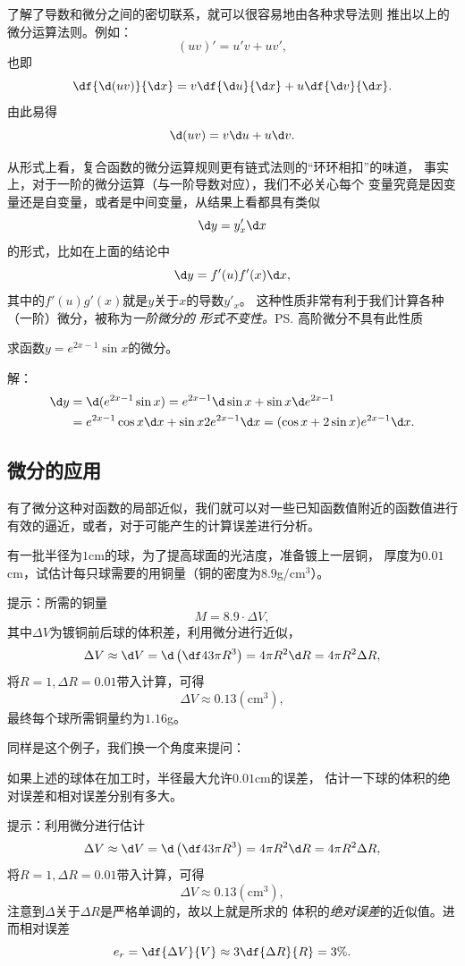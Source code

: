了解了导数和微分之间的密切联系，就可以很容易地由各种求导法则
推出以上的微分运算法则。例如：
$$(uv)'=u'v+uv',$$
也即
$$\df{\d(uv)}{\d x}=v\df{\d u}{\d x}+u\df{\d v}{\d x}.$$
由此易得
$$\d(uv)=v\d u+u\d v.$$

从形式上看，复合函数的微分运算规则更有链式法则的“环环相扣”的味道，
事实上，对于一阶的微分运算（与一阶导数对应），我们不必关心每个
变量究竟是因变量还是自变量，或者是中间变量，从结果上看都具有类似
$$\d y=y'_x\d x$$
的形式，比如在上面的结论中
$$\d y=f'(u)f'(x)\d x,$$
其中的$f'(u)g'(x)$就是$y$关于$x$的导数$y'_x$。
这种性质非常有利于我们计算各种（一阶）微分，被称为{\it 一阶微分的
形式不变性。}\ps{高阶微分不具有此性质}

\bs
\egz 求函数$y=e^{2x-1}\sin x$的微分。

解：
\begin{align*}
	\d y
	&=\d(e^{2x-1}\sin x)
	=e^{2x-1}\d\sin x+\sin x\d e^{2x-1}\\
	&=e^{2x-1}\cos x\d x+\sin x 2e^{2x-1}\d x
	=(\cos x+2\sin x)e^{2x-1}\d x.
\end{align*}
\fin

\subsection{微分的应用}

有了微分这种对函数的局部近似，我们就可以对一些已知函数值附近的函数值进行
有效的逼近，或者，对于可能产生的计算误差进行分析。

\bs
\egz 
有一批半径为$1$cm的球，为了提高球面的光洁度，准备镀上一层铜，
厚度为$0.01$cm，试估计每只球需要的用铜量（铜的密度为$8.9$g/cm$^3$）。

提示：所需的铜量
$$M=8.9\cdot\Delta V,$$
其中$\Delta V$为镀铜前后球的体积差，利用微分进行近似，
$$\Delta V\approx \d V=\d\left(\df43\pi R^3\right)
=4\pi R^2\d R=4\pi R^2\Delta R,$$
将$R=1,\Delta R=0.01$带入计算，可得
$$\Delta V\approx 0.13(\mbox{cm}^3),$$
最终每个球所需铜量约为$1.16$g。

同样是这个例子，我们换一个角度来提问：

\egz 如果上述的球体在加工时，半径最大允许$0.01$cm的误差，
估计一下球的体积的绝对误差和相对误差分别有多大。

提示：利用微分进行估计
$$\Delta V\approx \d V=\d\left(\df43\pi R^3\right)
=4\pi R^2\d R=4\pi R^2\Delta R,$$
将$R=1,\Delta R=0.01$带入计算，可得
$$\Delta V\approx 0.13(\mbox{cm}^3),$$
注意到$\Delta$关于$\Delta R$是严格单调的，故以上就是所求的
体积的{\it 绝对误差}的近似值。进而相对误差
$$e_r=\df{\Delta V}{V}\approx 3\df{\Delta R}{R}=3\%.$$

